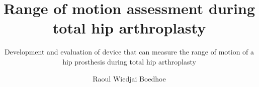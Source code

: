 \documentclass[whitelogo]{tudelft-report}
\begin{document}
\frontmatter


\title[tudelft-white]{Range of motion assessment during total hip arthroplasty}
\subtitle[tudelft-black]{Development and evaluation of  device that can measure the range of motion of a hip prosthesis during total hip arthroplasty}
\author[tudelft-white]{Raoul Wiedjai Boedhoe}
\makecover[split]









\tableofcontents

\mainmatter
\end{document}

